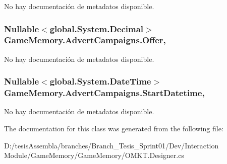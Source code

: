 No hay documentación de metadatos disponible. 

\hypertarget{class_game_memory_1_1_advert_campaigns_a9d2fcb82eb2b201a608017335a28567e}{
\subsubsection[{Offer}]{\setlength{\rightskip}{0pt plus 5cm}Nullable$<$global.\-System.\-Decimal$>$ Game\-Memory.\-Advert\-Campaigns.\-Offer\hspace{0.3cm}{\ttfamily [get]}, {\ttfamily [set]}}}\label{class_game_memory_1_1_advert_campaigns_a9d2fcb82eb2b201a608017335a28567e}


No hay documentación de metadatos disponible. 

\hypertarget{class_game_memory_1_1_advert_campaigns_a97c112e92c8edbcc4fa00ed2573de907}{
\subsubsection[{Start\-Datetime}]{\setlength{\rightskip}{0pt plus 5cm}Nullable$<$global.\-System.\-Date\-Time$>$ Game\-Memory.\-Advert\-Campaigns.\-Start\-Datetime\hspace{0.3cm}{\ttfamily [get]}, {\ttfamily [set]}}}\label{class_game_memory_1_1_advert_campaigns_a97c112e92c8edbcc4fa00ed2573de907}


No hay documentación de metadatos disponible. 



The documentation for this class was generated from the following file\-:\begin{DoxyCompactItemize}
\item 
D\-:/tesis\-Assembla/branches/\-Branch\-\_\-\-Tesis\-\_\-\-Sprint01/\-Dev/\-Interaction Module/\-Game\-Memory/\-Game\-Memory/O\-M\-K\-T.\-Designer.\-cs\end{DoxyCompactItemize}
